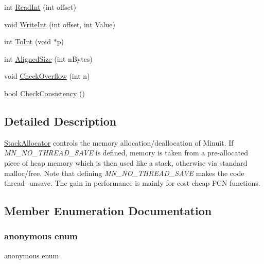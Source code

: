 \begin{DoxyCompactItemize}
\item 
int \mbox{\hyperlink{classROOT_1_1Minuit2_1_1StackAllocator_a811df825be4e6f67dc5a9139eb2edfdd}{Read\+Int}} (int offset)
\item 
void \mbox{\hyperlink{classROOT_1_1Minuit2_1_1StackAllocator_a1f87ef34658b74aa3fff9abd1cd1094e}{Write\+Int}} (int offset, int Value)
\item 
int \mbox{\hyperlink{classROOT_1_1Minuit2_1_1StackAllocator_a8c8afb9902a08eec0ec7c863636694e5}{To\+Int}} (void $\ast$p)
\item 
int \mbox{\hyperlink{classROOT_1_1Minuit2_1_1StackAllocator_ab40fb208cf8d4c0b3edf51137672c3d1}{Aligned\+Size}} (int n\+Bytes)
\item 
void \mbox{\hyperlink{classROOT_1_1Minuit2_1_1StackAllocator_a96a7565f7b4bb269f740901eef54a97e}{Check\+Overflow}} (int n)
\item 
bool \mbox{\hyperlink{classROOT_1_1Minuit2_1_1StackAllocator_ad1189cdc76a07c36ef1924ad2488797d}{Check\+Consistency}} ()
\end{DoxyCompactItemize}


\subsection{Detailed Description}
\mbox{\hyperlink{classROOT_1_1Minuit2_1_1StackAllocator}{Stack\+Allocator}} controls the memory allocation/deallocation of Minuit. If {\itshape M\+N\+\_\+\+N\+O\+\_\+\+T\+H\+R\+E\+A\+D\+\_\+\+S\+A\+VE} is defined, memory is taken from a pre-\/allocated piece of heap memory which is then used like a stack, otherwise via standard malloc/free. Note that defining {\itshape M\+N\+\_\+\+N\+O\+\_\+\+T\+H\+R\+E\+A\+D\+\_\+\+S\+A\+VE} makes the code thread-\/ unsave. The gain in performance is mainly for cost-\/cheap F\+CN functions. 

\subsection{Member Enumeration Documentation}
\mbox{\label{classROOT_1_1Minuit2_1_1StackAllocator_a4f1aad4338e435243f6ab52ce05fbbd4}} 
\subsubsection{\texorpdfstring{anonymous enum}{anonymous enum}}
{\footnotesize\ttfamily anonymous enum}

